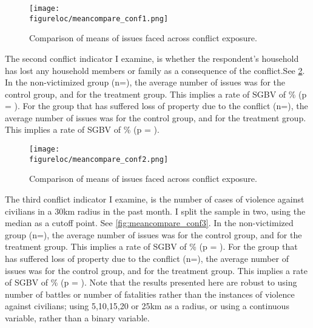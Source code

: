 \documentclass[10pt,a4paper]{scrartcl} %
\newcommand{\figureloc}{C:/Users/Koen/Dropbox/PhD/Papers/CongoGBV/Figures}
\begin{document}
\begin{figure}[H]
  \texttt{[image: \\figureloc/meancompare\_conf1.png]}
  \caption{Comparison of means of issues faced across conflict exposure.}
  \label{fig:meancompare_conf1}
\end{figure}

The second conflict indicator I examine, is whether the respondent's household has lost any household members or family as a consequence of the conflict.See \ref{fig:meancompare_conf2}. In the non-victimized group (n=), the average number of issues was  for the control group, and  for the treatment group. This implies a rate of SGBV of \% (p = ). For the group that has suffered loss of property due to the conflict (n=), the average number of issues was  for the control group, and  for the treatment group. This implies a rate of SGBV of \% (p = ).

\begin{figure}[H]
  \texttt{[image: \\figureloc/meancompare\_conf2.png]}
  \caption{Comparison of means of issues faced across conflict exposure.}
  \label{fig:meancompare_conf2}
\end{figure}


The third conflict indicator I examine, is the number of cases of violence against civilians in a 30km radius in the past month. I split the sample in two, using the median as a cutoff point. See \ref{fig:meancompare_conf3}. In the non-victimized group (n=), the average number of issues was  for the control group, and  for the treatment group. This implies a rate of SGBV of \% (p = ). For the group that has suffered loss of property due to the conflict (n=), the average number of issues was  for the control group, and  for the treatment group. This implies a rate of SGBV of \% (p = ). Note that the results presented here are robust to using number of battles or number of fatalities rather than the instances of violence against civilians; using 5,10,15,20 or 25km as a radius, or using a continuous variable, rather than a binary variable.  
\end{document}
